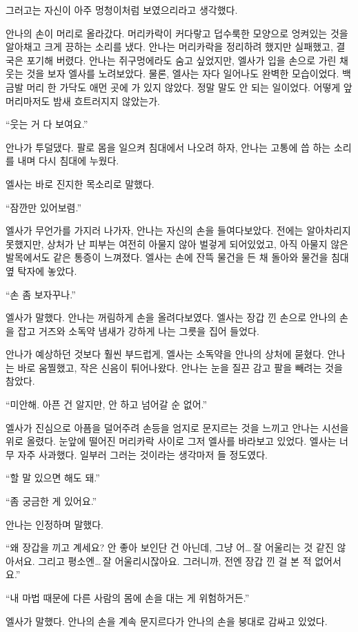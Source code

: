 그러고는 자신이 아주 멍청이처럼 보였으리라고 생각했다.

안나의 손이 머리로 올라갔다. 머리카락이 커다랗고 덥수룩한 모양으로 엉켜있는 것을 알아채고 크게 끙하는 소리를 냈다. 안나는 머리카락을 정리하려 했지만 실패했고, 결국은 포기해 버렸다. 안나는 쥐구멍에라도 숨고 싶었지만, 엘사가 입을 손으로 가린 채 웃는 것을 보자 엘사를 노려보았다. 물론, 엘사는 자다 일어나도 완벽한 모습이었다. 백금발 머리 한 가닥도 애먼 곳에 가 있지 않았다. 정말 말도 안 되는 일이었다. 어떻게 앞머리마저도 밤새 흐트러지지 않았는가.

``웃는 거 다 보여요.''

안나가 투덜댔다. 팔로 몸을 일으켜 침대에서 나오려 하자, 안나는 고통에 씁 하는 소리를 내며 다시 침대에 누웠다.

엘사는 바로 진지한 목소리로 말했다.

``잠깐만 있어보렴.''

엘사가 무언가를 가지러 나가자, 안나는 자신의 손을 들여다보았다. 전에는 알아차리지 못했지만, 상처가 난 피부는 여전히 아물지 않아 벌겋게 되어있었고, 아직 아물지 않은 발목에서도 같은 통증이 느껴졌다. 엘사는 손에 잔뜩 물건을 든 채 돌아와 물건을 침대 옆 탁자에 놓았다.

``손 좀 보자꾸나.''

엘사가 말했다. 안나는 꺼림하게 손을 올려다보였다. 엘사는 장갑 낀 손으로 안나의 손을 잡고 거즈와 소독약 냄새가 강하게 나는 그릇을 집어 들었다.

안나가 예상하던 것보다 훨씬 부드럽게, 엘사는 소독약을 안나의 상처에 묻혔다. 안나는 바로 움찔했고, 작은 신음이 튀어나왔다. 안나는 눈을 질끈 감고 팔을 빼려는 것을 참았다.

``미안해. 아픈 건 알지만, 안 하고 넘어갈 순 없어.''

엘사가 진심으로 아픔을 덜어주려 손등을 엄지로 문지르는 것을 느끼고 안나는 시선을 위로 올렸다. 눈앞에 떨어진 머리카락 사이로 그저 엘사를 바라보고 있었다. 엘사는 너무 자주 사과했다. 일부러 그러는 것이라는 생각마저 들 정도였다.

``할 말 있으면 해도 돼.''

``좀 궁금한 게 있어요.''

안나는 인정하며 말했다.

``왜 장갑을 끼고 계세요? 안 좋아 보인단 건 아닌데, 그냥 어\ldots\,잘 어울리는 것 같진 않아서요. 그리고 평소엔\ldots\,잘 어울리시잖아요. 그러니까, 전엔 장갑 낀 걸 본 적 없어서요.''

``내 마법 때문에 다른 사람의 몸에 손을 대는 게 위험하거든.''

엘사가 말했다. 안나의 손을 계속 문지르다가 안나의 손을 붕대로 감싸고 있었다.

